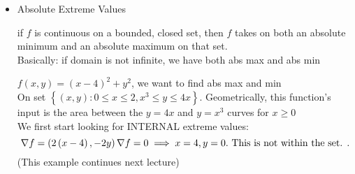 \begin{itemize}
\begin{theorem}
\begin{enumerate}
				\item if $D > 0$, $A,C < 0$ $\left( x_0,y_0 \right) $ is a local maximum\\
				\item if $ D = 0$, you know nothing
			\end{enumerate}
			(question) can $D=0$?
		\end{theorem}
		\begin{example}
			$f\left( x,y \right) = xy$ 
			\[
			f_x = y, f_{xy} = 0 = A\\
			f_y = x, f_{yy} = 0 = C\\
			f_{xy} = 1 = B\\
			.\] 
			$\therefore D = AC-B^2 = -1 < 0$, therefore $\left( 0,0 \right) $ is a saddle point.
		\end{example}
		\begin{example}
			$f\left( x,y,z \right)  = 2x^2 + y^2 -xy - 7y, \nabla f = 0$ at $\left( 1,4 \right) , f\left( 1,4 \right)  = -14$ 
			\begin{align*}
				f_x &= 4x-y\\
				f_y &= 2y-x-7 \\
				f_{x x} &= 4 = A\\
				f_{yy} &= 2 = C\\
				f_{xy} &= -1 = B \\
			.\end{align*}
			$ \therefore  D = 8 - 1 = 7 > 0$ and $A = 4 > 0$ which shows it's a local minimum
		\end{example}
	\item Absolute Extreme Values\\
		\begin{theorem}
			if $f$ is continuous on a bounded, closed set, then $f$ takes on both an absolute minimum and an absolute maximum on that set.\\
			Basically: if domain is not infinite, we have both abs max and abs min
		\end{theorem}
		\begin{example}
			$f\left( x,y \right)  = \left( x-4 \right) ^2 + y^2$, we want to find abs max and min\\
			On set $\left\{ \left( x,y \right) : 0 \le  x \le  2, x^3 \le  y \le 4x \right\} $. Geometrically, this function's input is the area between the $ y = 4x$ and $y = x^3$ curves for $x \ge  0$\\
			We first start looking for INTERNAL extreme values:
			\[
			 \nabla f = \left( 2\left( x-4 \right) , -2y \right) \\
			 \nabla f = 0 \implies x = 4, y = 0. \text{ This is not within the set. }
			.\] 
			(This example continues next lecture)
		\end{example}
\end{itemize}
